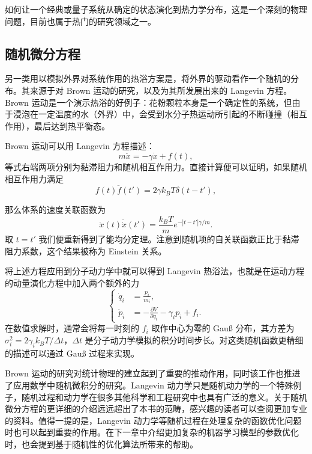 如何让一个经典或量子系统从确定的状态演化到热力学分布，这是一个深刻的物理问题，目前也属于热门的研究领域之一。

\subsection{随机微分方程}

另一类用以模拟外界对系统作用的热浴方案是，将外界的驱动看作一个随机的分布。其来源于对 Brown 运动的研究，以及为其所发展出来的 Langevin 方程。Brown 运动是一个演示热浴的好例子：花粉颗粒本身是一个确定性的系统，但由于浸泡在一定温度的水（外界）中，会受到水分子热运动所引起的不断碰撞（相互作用），最后达到热平衡态。

Brown 运动可以用 Langevin 方程描述：
\begin{equation}
m\ddot x=-\gamma\dot x+f(t),
\tag{7.4.6}
\end{equation}
等式右端两项分别为黏滞阻力和随机相互作用力。直接计算便可以证明，如果随机相互作用力满足
\begin{equation}
\overline{f(t)f(t')}=2\gamma k_BT\delta(t-t'),
\tag{7.4.7}
\end{equation}

那么体系的速度关联函数为
\begin{equation}
\overline{\dot x(t)\dot x(t')}=\frac{k_BT}{m}e^{-|t-t'|\gamma/m}.
\tag{7.4.8}
\end{equation}
取 $t=t'$ 我们便重新得到了能均分定理。注意到随机项的自关联函数正比于黏滞阻力系数，这个结果被称为 Einstein 关系。

将上述方程应用到分子动力学中就可以得到 Langevin 热浴法，也就是在运动方程的动量演化方程中加入两个额外的力
\begin{equation}
\left\{
\begin{aligned}
\dot q_i&=\frac{p_i}{m_i},\\
\dot p_i&=-\frac{\partial V}{\partial q_i}-\gamma_i p_i+f_i.
\end{aligned}
\right.
\tag{7.4.9}
\end{equation}
在数值求解时，通常会将每一时刻的 $f_i$ 取作中心为零的 Gauß 分布，其方差为 $\sigma_i^2=2\gamma_i k_BT/\Delta t$，$\Delta t$ 是分子动力学模拟的积分时间步长。对这类随机函数更精细的描述可以通过 Gauß 过程来实现。

Brown 运动的研究对统计物理的建立起到了重要的推动作用，同时该工作也推进了应用数学中随机微积分的研究。Langevin 动力学只是随机动力学的一个特殊例子，随机过程和动力学在很多其他科学和工程研究中也具有广泛的意义。关于随机微分方程的更详细的介绍远远超出了本书的范畴，感兴趣的读者可以查阅更加专业的资料。值得一提的是，Langevin 动力学等随机过程在处理复杂的函数优化问题时也可以起到重要的作用。在下一章中介绍更加复杂的机器学习模型的参数优化时，也会提到基于随机性的优化算法所带来的帮助。

